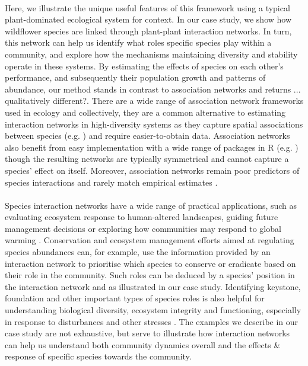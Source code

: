 \documentclass[a4,12pt]{article}
\begin{document}
    \paragraph{}
    Here, we illustrate the unique useful features of this framework using a typical plant-dominated ecological system for context. In our case study, we show how wildflower species are linked through  plant-plant interaction networks. In turn, this network can help us identify what roles specific species play within a community, and explore how the mechanisms maintaining diversity and stability operate in these systems. By estimating the effects of species on each other's performance, and subsequently their population growth and patterns of abundance, our method stands in contrast to association networks and returns ... qualitatively different?. There are a wide range of association network frameworks used in ecology \parencite{} and collectively, they are a common alternative to estimating interaction networks in high-diversity systems as they capture spatial associations between species (e.g. \cite{Saiz2011}) and require easier-to-obtain data. Association networks also benefit from easy implementation with a wide range of packages in R (e.g. \cite{Griffith2016}) though the resulting networks are typically symmetrical and cannot capture a species' effect on itself. Moreover, association networks remain poor predictors of species interactions and rarely match empirical estimates \parencite{Sander2017,Barner2018, Thurman2019, Blanchet2020}.

    \paragraph{}
    Species interaction networks have a wide range of practical applications, such as evaluating ecosystem response to human-altered landscapes, guiding future management decisions \parencite{Ross2011} or exploring how communities may respond to global warming \parencite{Gorman2019}. Conservation and ecosystem management efforts aimed at regulating species abundances can, for example, use the information provided by an interaction network to prioritise which species to conserve or eradicate based on their role in the community. Such roles can be deduced by a species' position in the interaction network \parencite{Cirtwill2018a} and as illustrated in our case study. Identifying keystone, foundation and other important types of species roles is also helpful for understanding biological diversity, ecosystem integrity and functioning, especially in response to disturbances and other stresses \parencite{Nyakatya2008, Orwin2016, Losapio2017, Narwani2019}. The examples we describe in our case study are not exhaustive, but serve to illustrate how interaction networks can help us understand both community dynamics overall and the effects \& response of specific species towards the community. 
\end{document}
